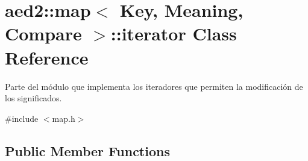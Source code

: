 \hypertarget{classaed2_1_1map_1_1iterator}{\section{aed2\-:\-:map$<$ \-Key, \-Meaning, \-Compare $>$\-:\-:iterator \-Class \-Reference}
\label{classaed2_1_1map_1_1iterator}
}


\-Parte del módulo que implementa los iteradores que permiten la modificación de los significados.  




{\ttfamily \#include $<$map.\-h$>$}

\subsection*{\-Public \-Member \-Functions}
